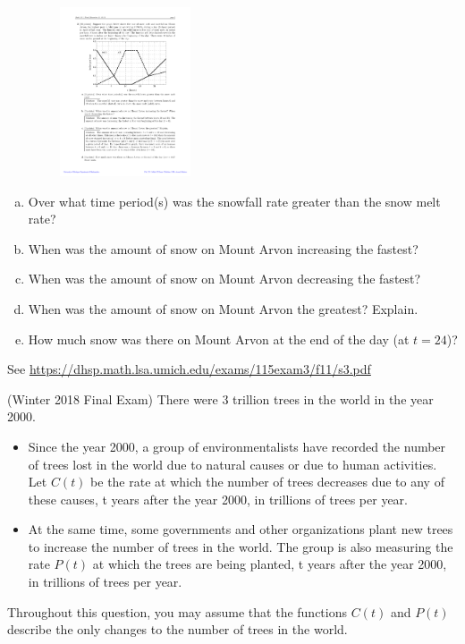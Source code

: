 \documentclass[11pt]{exam}
\begin{document}
\begin{questions}
\begin{center}
\includegraphics[width=7cm,height=5cm]{Figures/fig1.pdf}
\end{center}
\begin{enumerate}[(a)]
	\item Over what time period(s) was the snowfall rate greater than the snow melt rate?
	\item When was the amount of snow on Mount Arvon increasing the fastest?
	\item When was the amount of snow on Mount Arvon decreasing the fastest?
	\item When was the amount of snow on Mount Arvon the greatest? Explain.
	\item How much snow was there on Mount Arvon at the end of the day (at $t=24$)?
\end{enumerate}
\begin{solution}
  See \href{https://dhsp.math.lsa.umich.edu/exams/115exam3/f11/s3.pdf}{https://dhsp.math.lsa.umich.edu/exams/115exam3/f11/s3.pdf}
\end{solution}
\question (Winter 2018 Final Exam) %
	There were 3 trillion trees in the world in the year 2000.
\begin{itemize}
	\item Since the year 2000, a group of environmentalists have recorded the number of trees lost in the world due to natural causes or due to human activities. Let $C(t)$ be the rate at which the number of trees decreases due to any of these causes, t years after the year 2000, in trillions of trees per year.
	\item At the same time, some governments and other organizations plant new trees to increase the number of trees in the world. The group is also measuring the rate $P(t)$ at which the trees are being planted, t years after the year 2000, in trillions of trees per year.
\end{itemize}
Throughout this question, you may assume that the functions $C(t)$ and $P(t)$ describe the only changes to the number of trees in the world.

\end{questions}
\end{document}
